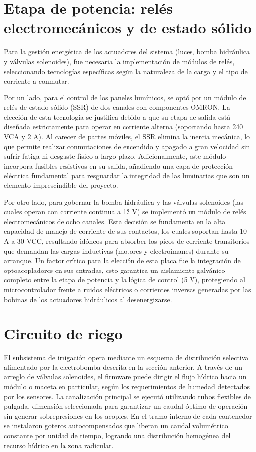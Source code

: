 \section{Etapa de potencia: relés electromecánicos y de estado sólido}
\label{sec:etapa_potencia}

Para la gestión energética de los actuadores del sistema (luces, bomba hidráulica y válvulas solenoides), fue necesaria la implementación de módulos de relés, seleccionando tecnologías específicas según la naturaleza de la carga y el tipo de corriente a conmutar.

Por un lado, para el control de los paneles lumínicos, se optó por un módulo de relés de estado sólido (SSR) de dos canales con componentes OMRON. La elección de esta tecnología se justifica debido a que su etapa de salida está diseñada estrictamente para operar en corriente alterna (soportando hasta 240 VCA y 2 A). Al carecer de partes móviles, el SSR elimina la inercia mecánica, lo que permite realizar conmutaciones de encendido y apagado a gran velocidad sin sufrir fatiga ni desgaste físico a largo plazo. Adicionalmente, este módulo incorpora fusibles resistivos en su salida, añadiendo una capa de protección eléctrica fundamental para resguardar la integridad de las luminarias que son un elemento imprescindible del proyecto.

Por otro lado, para gobernar la bomba hidráulica y las válvulas solenoides (las cuales operan con corriente continua a 12 V) se implementó un módulo de relés electromecánicos de ocho canales. Esta decisión se fundamenta en la alta capacidad de manejo de corriente de sus contactos, los cuales soportan hasta 10 A a 30 VCC, resultando idóneos para absorber los picos de corriente transitorios que demandan las cargas inductivas (motores y electroimanes) durante su arranque. Un factor crítico para la elección de esta placa fue la integración de optoacopladores en sus entradas, esto garantiza un aislamiento galvánico completo entre la etapa de potencia y la lógica de control (5 V), protegiendo al microcontrolador frente a ruidos eléctricos o corrientes inversas generadas por las bobinas de los actuadores hidráulicos al desenergizarse.

\section{Circuito de riego}
\label{sec:circuito_riego}

El subsistema de irrigación opera mediante un esquema de distribución selectiva alimentado por la electrobomba descrita en la sección anterior. A través de un arreglo de válvulas solenoides, el firmware puede dirigir el flujo hídrico hacia un módulo o maceta en particular, según los requerimientos de humedad detectados por los sensores. La canalización principal se ejecutó utilizando tubos flexibles de \textonehalf{} pulgada, dimensión seleccionada para garantizar un caudal óptimo de operación sin generar sobrepresiones en los acoples. En el tramo interno de cada contenedor se instalaron goteros autocompensados que liberan un caudal volumétrico constante por unidad de tiempo, logrando una distribución homogénea del recurso hídrico en la zona radicular.

